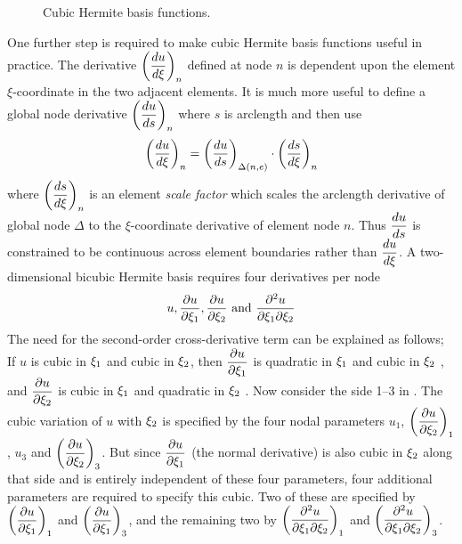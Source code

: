 \begin{figure}[htbp] \centering
  
  \caption{Cubic Hermite basis functions.}
  \label{fig:cubic}
\end{figure}

One further step is required to make cubic Hermite basis functions useful in
practice. The derivative $\left(  \dfrac{ d u}{d \xi}  \right)_{n}$ defined at node $n$
is dependent upon the element $\xi$-coordinate in the two adjacent elements.
It is much more useful to define a global node derivative
 $\left(  \dfrac{ d u}{d s}  \right)_{n}$ where $s$ is arclength and then use
\begin{equation}
  \left(  \dfrac{ d u}{d \xi}  \right)_{n}=\left(  \dfrac{ d u}{d s}  \right)_{ \Delta\left( n,e \right) } \cdot
  \left(  \dfrac{ d s}{d \xi}  \right)_{n} 
  \label{eqn:cubichbf}
\end{equation}
where $\left(  \dfrac{ d s}{d \xi}  \right)_{n}$ is an element \emph{scale factor} which scales
the arclength derivative of global node $\Delta$ to the $\xi$-coordinate
derivative of element node $n$. Thus $ \dfrac{ d u}{d s} $ is constrained to be
continuous across element boundaries rather than $ \dfrac{ d u}{d \xi} $. A two-
dimensional bicubic Hermite basis requires four derivatives per node
\begin{equation*}
  u,  \dfrac{\partial u}{\partial \xi_{1}} ,  \dfrac{\partial u}{\partial \xi_{2}}  \text{ and }
   \dfrac{\partial^{2} u}{\partial \xi_{1} \partial \xi_{2}} 
\end{equation*}
The need for the second-order cross-derivative term can be explained as
follows; If $u$ is cubic in $\xi_{1}$ and cubic in $\xi_{2}$, then
$ \dfrac{\partial u}{\partial \xi_{1}} $ is quadratic in $\xi_{1}$ and cubic in $\xi_{2}$ , and
$ \dfrac{\partial u}{\partial \xi_{2}} $ is cubic in $\xi_{1}$ and quadratic in $\xi_{2}$ . Now
consider the side 1--3 in . The cubic variation of $u$
with $\xi_{2}$ is specified by the four nodal parameters $u_{1}$,
$\left(  \dfrac{\partial u}{\partial \xi_{2}}  \right)_{1}$, $u_{3}$ and $\left(  \dfrac{\partial u}{\partial \xi_{2}}  \right)_{3}$.
But since $ \dfrac{\partial u}{\partial \xi_{1}} $ (the normal derivative) is also cubic in
$\xi_{2}$ along that side and is entirely independent of these four parameters,
four additional parameters are required to specify this cubic. Two of these
are specified by $\left(  \dfrac{\partial u}{\partial \xi_{1}}  \right)_{1}$ and
$\left(  \dfrac{\partial u}{\partial \xi_{1}}  \right)_{3}$, and the remaining two by
$\left(  \dfrac{\partial^{2} u}{\partial \xi_{1} \partial \xi_{2}}  \right)_{1}$ and
$\left(  \dfrac{\partial^{2} u}{\partial \xi_{1} \partial \xi_{2}}  \right)_{3}$.

